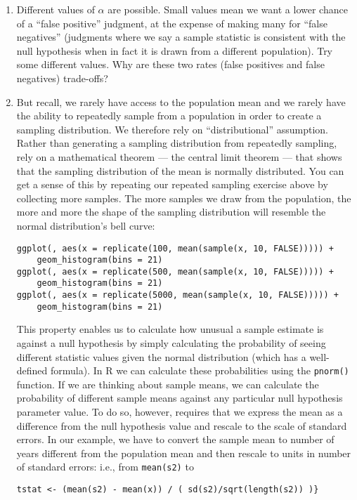 \documentclass[a4paper,12pt]{article}
\begin{document}
\begin{enumerate}
\item Different values of $\alpha$ are possible. Small values mean we want a lower chance of a ``false positive'' judgment, at the expense of making many for ``false negatives'' (judgments where we say a sample statistic is consistent with the null hypothesis when in fact it is drawn from a different population). Try some different values. Why are these two rates (false positives and false negatives) trade-offs?

\item But recall, we rarely have access to the population mean and we rarely have the ability to repeatedly sample from a population in order to create a sampling distribution. We therefore rely on ``distributional'' assumption. Rather than generating a sampling distribution from repeatedly sampling, rely on a mathematical theorem --- the central limit theorem --- that shows that the sampling distribution of the mean is normally distributed. You can get a sense of this by repeating our repeated sampling exercise above by collecting more samples. The more samples we draw from the population, the more and more the shape of the sampling distribution will resemble the normal distribution's bell curve:

\begin{verbatim}
ggplot(, aes(x = replicate(100, mean(sample(x, 10, FALSE))))) +
    geom_histogram(bins = 21)
ggplot(, aes(x = replicate(500, mean(sample(x, 10, FALSE))))) +
    geom_histogram(bins = 21)
ggplot(, aes(x = replicate(5000, mean(sample(x, 10, FALSE))))) +
    geom_histogram(bins = 21)
\end{verbatim}

\noindent This property enables us to calculate how unusual a sample estimate is against a null hypothesis by simply calculating the probability of seeing different statistic values given the normal distribution (which has a well-defined formula). In R we can calculate these probabilities using the \texttt{pnorm()} function. If we are thinking about sample means, we can calculate the probability of different sample means against any particular null hypothesis parameter value. To do so, however, requires that we express the mean as a difference from the null hypothesis value and rescale to the scale of standard errors. In our example, we have to convert the sample mean to number of years different from the population mean and then rescale to units in number of standard errors: i.e., from \texttt{mean(s2)} to 

\begin{verbatim}
tstat <- (mean(s2) - mean(x)) / ( sd(s2)/sqrt(length(s2)) )}
\end{verbatim}


\end{enumerate}
\end{document}
